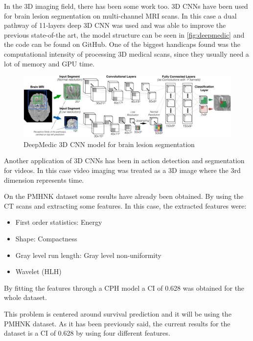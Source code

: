 In the 3D imaging field, there has been some work too. 3D \glspl{CNN} have
been used for brain lesion segmentation on multi-channel \gls{MRI} scans. In this case a 
dual pathway of 11-layers deep 3D \gls{CNN} was used and was able to improve the previous
state-of-the art, the model structure can be seen in \autoref{fig:deepmedic} and the code 
can be found on GitHub. 
One of the biggest handicaps found was the computational intensity of
processing 3D medical scans, since they usually need a lot of memory and GPU time.
~\cites{neural:deepmedic}{neural:3d-cnn-crf}

\begin{figure}
  \centering
  \includegraphics[width=\textwidth]{images/deepmedic}

  \caption[DeepMedic 3D CNN model]{
    DeepMedic 3D \acrshort{CNN} model for brain lesion segmentation \cite{neural:3d-cnn-crf}
    \label{fig:deepmedic}
  }
\end{figure}

Another application of 3D \glspl{CNN} has been in action detection and segmentation for videos.
In this case video imaging was treated as a 3D image where the 3rd dimension represents
time.
~\cite{neural:3d-cnn-action-detection}

On the \gls{PMHNK} dataset some results have already been obtained. By using the \gls{CT} scans and
extracting some features. In this case, the extracted features were:
\begin{itemize}
  \item First order statistics: Energy
  \item Shape: Compactness
  \item Gray level run length: Gray level non-uniformity
  \item Wavelet (HLH) 
\end{itemize}
By fitting the features through a \gls{CPH} model a \gls{CI} of 0.628 was obtained for the whole
dataset.
~\cite{medical:ct-based-radiomic-signature}


This problem is centered around survival prediction and it will be using the \gls{PMHNK} dataset. 
As it has been previously said, the current results for the dataset is a \gls{CI}
of 0.628 \cite{medical:ct-based-radiomic-signature} by using four different features.


